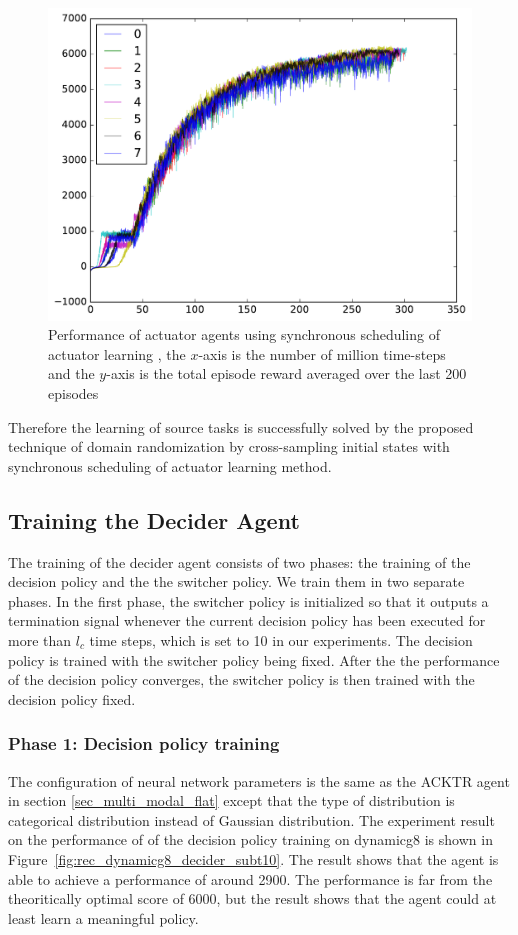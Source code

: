 \begin{figure}[!htbp]
	\includegraphics[width=\textwidth]{images/rec_sync_training.pdf}
	\centering
	\caption{Performance of actuator agents using synchronous scheduling of actuator learning , the $x$-axis is the number of million time-steps and the $y$-axis is the total episode reward averaged over the last 200 episodes}\label{rec_sync_training}
\end{figure}

Therefore the learning of source tasks is successfully solved by the proposed technique of domain randomization by cross-sampling initial states with synchronous scheduling of actuator learning method.
\subsection{Training the Decider Agent}
The training of the decider agent consists of two phases: the training of the decision policy and the the switcher policy. We train them in two separate phases. In the first phase, the switcher policy is initialized so that it outputs a termination signal whenever the current decision policy has been executed for more than $l_c$ time steps, which is set to 10 in our experiments. The decision policy is trained with the switcher policy being fixed. After the the performance of the decision policy converges, the switcher policy is then trained with the decision policy fixed.

\subsubsection{Phase 1: Decision policy training}
The configuration of neural network parameters is the same as the ACKTR agent in section \ref{sec_multi_modal_flat} except that the type of distribution is categorical distribution instead of Gaussian distribution.
The experiment result on the performance of of the decision policy training on dynamicg8 is shown in Figure~\ref{fig:rec_dynamicg8_decider_subt10}. The result shows that the agent is able to achieve a performance of around 2900. The performance is far from the theoritically optimal score of 6000, but the result shows that the agent could at least learn a meaningful policy.

